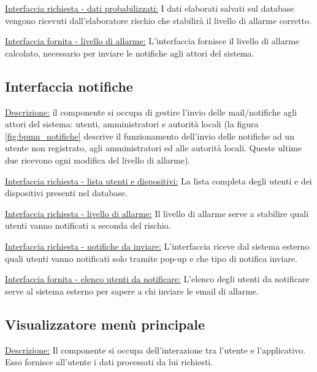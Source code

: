 \vspace{5mm}
\noindent
\underline{Interfaccia richiesta - dati probabilizzati:} I dati elaborati salvati sul database vengono ricevuti dall'elaboratore rischio che stabilirà il livello di allarme corretto.

\vspace{5mm}
\noindent
\underline{Interfaccia fornita - livello di allarme:} L'interfaccia fornisce il livello di allarme calcolato, necessario per inviare le notifiche agli attori del sistema.

\subsection*{Interfaccia notifiche}
\underline{Descrizione:} il componente si occupa di gestire l'invio delle mail/notifiche agli attori del sistema: utenti, amministratori e autorità locali (la figura \ref{fig:bpmn_notifiche} descrive il funzionamento dell'invio delle notifiche ad un utente non registrato, agli amministratori ed alle autorità locali. Queste ultime due ricevono ogni modifica del livello di allarme).

\vspace{5mm}
\noindent
\underline{Interfaccia richiesta - lista utenti e dispositivi:} La lista completa degli utenti e dei dispositivi presenti nel database.

\vspace{5mm}
\noindent
\underline{Interfaccia richiesta - livello di allarme:} Il livello di allarme serve a stabilire quali utenti vanno notificati a seconda del rischio.

\vspace{5mm}
\noindent
\underline{Interfaccia richiesta - notifiche da inviare:} L'interfaccia riceve dal sistema esterno quali utenti vanno notificati solo tramite pop-up e che tipo di notifica inviare.

\vspace{5mm}
\noindent
\underline{Interfaccia fornita - elenco utenti da notificare:} L'elenco degli utenti da notificare serve al sistema esterno per sapere a chi inviare le email di allarme.

\subsection*{Visualizzatore menù principale}
\underline{Descrizione:}
Il componente si occupa dell'interazione tra l'utente e l'applicativo. Esso fornisce all'utente i dati processati da lui richiesti.

